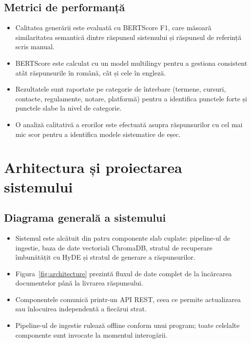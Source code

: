 \documentclass[12pt,a4paper]{report}
\begin{document}
\section{Metrici de performanță}
\begin{itemize}
    \item Calitatea generării este evaluată cu BERTScore F1, care măsoară similaritatea semantică dintre răspunsul sistemului și răspunsul de referință scris manual.
    \item BERTScore este calculat cu un model multilingv pentru a gestiona consistent atât răspunsurile în română, cât și cele în engleză.
    \item Rezultatele sunt raportate pe categorie de întrebare (termene, cursuri, contacte, regulamente, notare, platformă) pentru a identifica punctele forte și punctele slabe la nivel de categorie.
    \item O analiză calitativă a erorilor este efectuată asupra răspunsurilor cu cel mai mic scor pentru a identifica modele sistematice de eșec.
\end{itemize}


\chapter{Arhitectura și proiectarea sistemului}

\section{Diagrama generală a sistemului}
\begin{itemize}
    \item Sistemul este alcătuit din patru componente slab cuplate: pipeline-ul de ingestie, baza de date vectoriali ChromaDB, stratul de recuperare îmbunătățit cu HyDE și stratul de generare a răspunsurilor.
    \item Figura~\ref{fig:architecture} prezintă fluxul de date complet de la încărcarea documentelor până la livrarea răspunsului.
    \item Componentele comunică printr-un API REST, ceea ce permite actualizarea sau înlocuirea independentă a fiecărui strat.
    \item Pipeline-ul de ingestie rulează offline conform unui program; toate celelalte componente sunt invocate la momentul interogării.
\end{itemize}
\end{document}
